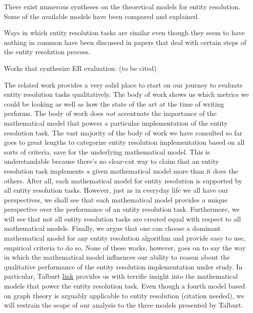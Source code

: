 \documentclass[11pt]{article}
\begin{document}
    There exist numerous syntheses on the theoretical models for entity
    resolution\cite{fs1969,Ben2009Swoosh,Tal11}.
    Some of the available models have been compared and
    explained\cite{Tal11,tal2013}.

    Ways in which entity resolution tasks are similar even though they seem
    to have nothing in common have been discussed in papers that deal with
    certain steps of the entity resolution process\cite{Pap19,Chen09}.

    Works that synthesize ER evaluation: (to be cited)

    The related work provides a very solid place to start on our journey to evaluate entity resolution tasks qualitatively. The body of work shows us which metrics we could be looking as well as how the state of the art at the time of writing performs. The body of work does \textit{not} accentuate the importance of the mathematical model that powers a particular implementation of the entity resolution task. The vast majority of the body of work we have consulted so far goes to great lengths to categorize entity resolution implementation based on all sorts of criteria, save for the underlying mathematical model. This is understandable because there's no clear-cut way to claim that an entity resolution task implements a given mathematical model more than it does the others. After all, each mathematical model for entity resolution is supported by all entity resolution tasks. However, just as in everyday life we all have our perspectives, we shall see that each mathematical model provides a unique perspective over the performance of an entity resolution task. Furthermore, we will see that not all entity resolution tasks are created equal with respect to all mathematical models. Finally, we argue that one can choose a dominant mathematical model for any entity resolution algorithm and provide easy to use, empirical criteria to do so. None of these works, however, goes on to say the way in which the mathematical model influences our ability to reason about the qualitative performance of the entity resolution implementation under study. In particular, Talburt \href{https://learning.oreilly.com/library/view/entity-resolution-and/9780123819734/}{link} provides us with terrific insight into the mathematical models that power the entity resolution task. Even though a fourth model based on graph theory is arguably applicable to entity resolution (citation needed), we will restrain the scope of our analysis to the three models presented by Talburt.
\end{document}
